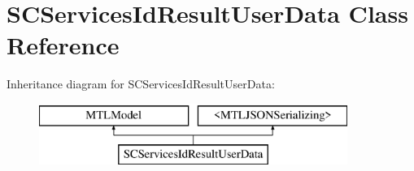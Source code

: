 \hypertarget{interface_s_c_services_id_result_user_data}{}\section{S\+C\+Services\+Id\+Result\+User\+Data Class Reference}
\label{interface_s_c_services_id_result_user_data}
Inheritance diagram for S\+C\+Services\+Id\+Result\+User\+Data\+:\begin{figure}[H]
\begin{center}
\leavevmode
\includegraphics[height=2.000000cm]{interface_s_c_services_id_result_user_data}
\end{center}
\end{figure}
